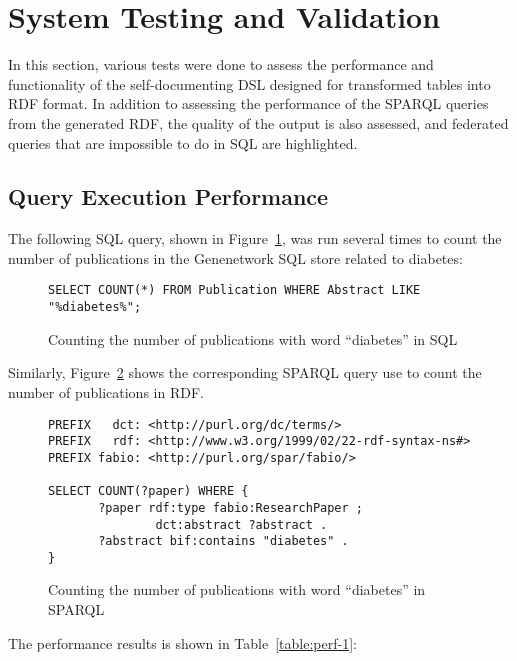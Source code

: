 \section{System Testing and Validation}

In this section, various tests were done to assess the performance and functionality of the self-documenting DSL designed for transformed tables into RDF format.  In addition to assessing the performance of the SPARQL queries from the generated RDF, the quality of the output is also assessed, and federated queries that are impossible to do in SQL are highlighted.

\subsection{Query Execution Performance}

The following SQL query, shown in Figure~\ref{sql:counting-pubs-with-diabetes}, was run several times to count the number of publications in the Genenetwork SQL store related to diabetes:

\begin{figure}[H]
\centering
\begin{verbatim}
SELECT COUNT(*) FROM Publication WHERE Abstract LIKE "%diabetes%";
\end{verbatim}
\caption{Counting the number of publications with word ``diabetes'' in SQL}\label{sql:counting-pubs-with-diabetes}
\end{figure}

Similarly, Figure~\ref{sparql:counting-pubs-with-diabetes} shows the corresponding SPARQL query use to count the number of publications in RDF\@.

\begin{figure}[H]
\centering
\begin{verbatim}
PREFIX   dct: <http://purl.org/dc/terms/>
PREFIX   rdf: <http://www.w3.org/1999/02/22-rdf-syntax-ns#>
PREFIX fabio: <http://purl.org/spar/fabio/>

SELECT COUNT(?paper) WHERE {
       ?paper rdf:type fabio:ResearchPaper ;
               dct:abstract ?abstract .
       ?abstract bif:contains "diabetes" .
}
\end{verbatim}
\caption{Counting the number of publications with word ``diabetes'' in SPARQL}\label{sparql:counting-pubs-with-diabetes}
\end{figure}

The performance results is shown in Table~\ref{table:perf-1}:

